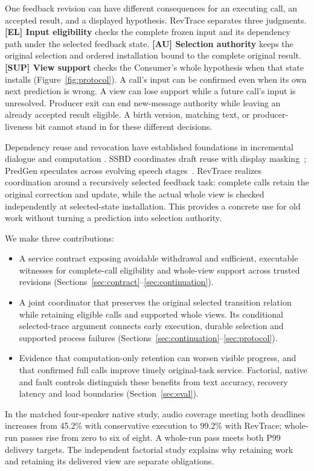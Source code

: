 One feedback revision can have different consequences for an executing
call, an accepted result, and a displayed hypothesis. RevTrace separates
three judgments. \textbf{[EL] Input eligibility} checks the complete frozen
input and its dependency path under the selected feedback state.
\textbf{[AU] Selection authority} keeps the original selection and ordered
installation bound to the complete original result. \textbf{[SUP] View
support} checks the Consumer's whole hypothesis when that state installs
(Figure~\ref{fig:protocol}). A call's input can be confirmed even when its
own next prediction is wrong. A view can lose support while a future
call's input is unresolved. Producer exit can end new-message authority
while leaving an already accepted result eligible. A birth version,
matching text, or producer-liveness bit cannot stand in for these
different decisions.

Dependency reuse and revocation have established foundations in
incremental dialogue and computation
\cite{schlangen2011incremental,hammer2014adapton,hammer2015names}.
SSBD coordinates draft reuse with display masking~\cite{zeng2026ssbd};
PredGen speculates across evolving speech stages~\cite{li2025predgen}.
RevTrace realizes coordination around a recursively selected feedback
task: complete calls retain the original correction and update, while
the actual whole view is checked independently at selected-state
installation. This provides a concrete use for old work without turning
a prediction into selection authority.

We make three contributions:
\begin{itemize}
\item A service contract exposing avoidable withdrawal and sufficient,
  executable witnesses for complete-call eligibility and whole-view
  support across trusted revisions
  (Sections~\ref{sec:contract}--\ref{sec:continuation}).
\item A joint coordinator that preserves the original selected transition
  relation while retaining eligible calls and supported whole views.
  Its conditional selected-trace argument connects early execution,
  durable selection and supported process failures
  (Sections~\ref{sec:continuation}--\ref{sec:protocol}).
\item Evidence that computation-only retention can worsen visible
  progress, and that confirmed full calls improve timely original-task
  service. Factorial, native and fault controls distinguish these benefits
  from text accuracy, recovery latency and load boundaries
  (Section~\ref{sec:eval}).
\end{itemize}

In the matched four-speaker native study, audio coverage meeting both
deadlines increases from 45.2\% with conservative execution to 99.2\% with
RevTrace; whole-run passes rise from zero to six of eight. A whole-run
pass meets both P99 delivery targets. The independent factorial study explains why
retaining work and retaining its delivered view are separate obligations.
